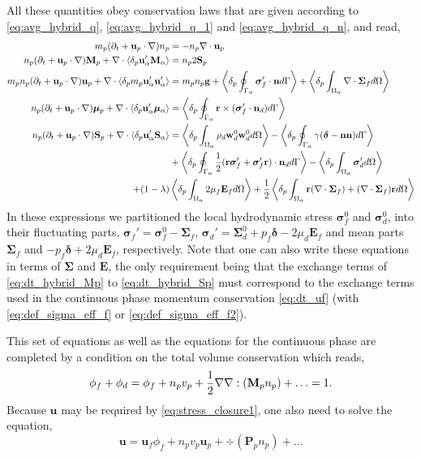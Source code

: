 All these quantities obey conservation laws that are given according to \ref{eq:avg_hybrid_q}, \ref{eq:avg_hybrid_q_1} and \ref{eq:avg_hybrid_q_n}, and read, 
\begin{align}
    m_p(\pddt + \textbf{u}_p \cdot \grad)n_p
    &=
    - n_p \div \textbf{u}_p\\
    n_p (\pddt + \textbf{u}_p \cdot \grad) \textbf{M}_p
    +\div  \pavg{\textbf{u}_\alpha'\textbf{M}_\alpha}
    &=
    n_p2  \textbf{S}_p
    \label{eq:dt_hybrid_Mp}\\
    \label{eq:dt_hybrid_up}
    m_p n_p(\pddt + \textbf{u}_p \cdot \grad)\textbf{u}_p
    + \div \pavg{m_p \textbf{u}_\alpha'\textbf{u}_\alpha'}
    &=
    m_p n_p \textbf{g}
    + \pSavg{\bm\sigma_f' \cdot \textbf{n}}
    + \pOavg{\div\bm\Sigma_f}\\
    \label{eq:dt_hybrid_mup}
    n_p (\pddt + \textbf{u}_p \cdot \grad) \bm{\mu}_p
    +\div  \pavg{\textbf{u}_\alpha'\bm\mu_\alpha}
    &=
    \pSavg{\textbf{r}\times(\bm\sigma_f'\cdot \textbf{n}_d)}
    \\
    \label{eq:dt_hybrid_Sp}
    n_p (\pddt + \textbf{u}_p \cdot \grad) \textbf{S}_p
    +\div  \pavg{\textbf{u}_\alpha'\textbf{S}_\alpha}
    &=
    \pOavg{
        \rho_d \textbf{w}_d^0  \textbf{w}_d^0 
    }
    -  \pSavg{\gamma (\bm\delta - \textbf{nn})}\nonumber\\
    &+\pSavg{\frac{1}{2}(\textbf{r}\bm\sigma_f'+\bm\sigma_f'\textbf{r})\cdot \textbf{n}_d}
    - \pOavg{
        \bm{\sigma}_d'
    }\nonumber \\
    + (1-\lambda)&\pOavg{2\mu_f\textbf{E}_f}
    + \frac{1}{2}\pOavg{\textbf{r}(\div\bm\Sigma_f)+ (\div\bm\Sigma_f) \textbf{r}}
\end{align}
In these expressions we partitioned the local hydrodynamic stress $\bm\sigma_f^0$ and $\bm\sigma_d^0$, into their fluctuating parts, $\bm\sigma_f'=\bm\sigma_f^0 - \bm\Sigma_f$,  $\bm\sigma_d' = \bm\Sigma_d^0 + p_f\bm\delta - 2\mu_d \textbf{E}_f$ and mean parts $\bm\Sigma_f$ and $-p_f \bm\delta + 2\mu_d \textbf{E}_f$, respectively. 
Note that one can also write these equations in terms of $\bm\Sigma$ and $\textbf{E}$, the only requirement being that the exchange terms of \ref{eq:dt_hybrid_Mp} to \ref{eq:dt_hybrid_Sp} must correspond to the exchange terms used in the continuous phase momentum conservation \eqref{eq:dt_uf} (with \ref{eq:def_sigma_eff_f} or \ref{eq:def_sigma_eff_f2}). 

This set of equations as well as the equations for the continuous phase are completed by a condition on the total volume conservation which reads, 
\begin{equation}
    \phi_f + \phi_d = 
    \phi_f +  n_pv_p + \frac{1}{2}\grad\grad : (\textbf{M}_p n_p) + \ldots = 1. 
    \label{eq:volume_conservation}
\end{equation}
Because $\textbf{u}$ may be required by \ref{eq:stress_closure1}, one also need to solve the equation, 
\begin{equation}
    \textbf{u} = \textbf{u}_f\phi_f + 
    n_pv_p\textbf{u}_p + \div  (\textbf{P}_p n_p) + \ldots
    \label{eq:velocity_conservation}
\end{equation}

